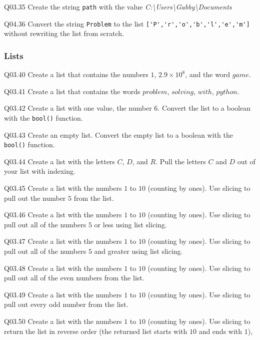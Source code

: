 \documentclass{book}
\begin{document}
Q03.35 Create the string \lstinline!path! with the value
\emph{C:\textbackslash{}Users\textbackslash{}Gabby\textbackslash{}Documents}

Q04.36 Convert the string \lstinline!Problem! to the list
\lstinline!['P','r','o','b','l','e','m']! without rewriting the list
from scratch.
    




    
        \subsubsection{Lists}\label{lists}

Q03.40 Create a list that contains the numbers \(1\),
\(2.9 \times 10^8\), and the word \(game\).

Q03.41 Create a list that contains the words \(problem\), \(solving\),
\(with\), \(python\).

Q03.42 Create a list with one value, the number \(6\). Convert the list
to a boolean with the \lstinline!bool()! function.

Q03.43 Create an empty list. Convert the empty list to a boolean with
the \lstinline!bool()! function.

Q03.44 Create a list with the letters \(C\), \(D\), and \(R\). Pull the
letters \(C\) and \(D\) out of your list with indexing.

Q03.45 Create a list with the numbers \(1\) to \(10\) (counting by
ones). Use slicing to pull out the number \(5\) from the list.

Q03.46 Create a list with the numbers \(1\) to \(10\) (counting by
ones). Use slicing to pull out all of the numbers \(5\) or less using
list slicing.

Q03.47 Create a list with the numbers \(1\) to \(10\) (counting by
ones). Use slicing to pull out all of the numbers \(5\) and greater
using list slicing.

Q03.48 Create a list with the numbers \(1\) to \(10\) (counting by
ones). Use slicing to pull out all of the even numbers from the list.

Q03.49 Create a list with the numbers \(1\) to \(10\) (counting by
ones). Use slicing to pull out every odd number from the list.

Q03.50 Create a list with the numbers \(1\) to \(10\) (counting by
ones). Use slicing to return the list in reverse order (the returned
list starts with \(10\) and ends with \(1\)),
    
\end{document}
